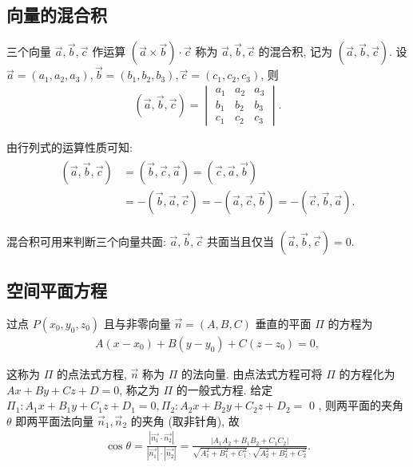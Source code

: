 \subsection{向量的混合积}
三个向量 $\vec{a} , \vec{b} , \vec{c}$ 作运算 $(\vec{a} \times \vec{b}) \cdot \vec{c}$ 称为 $\vec{a} , \vec{b} , \vec{c}$ 的混合积, 记为 $(\vec{a}, \vec{b}, \vec{c})$.
设 $\vec{a}=\left(a_1, a_2, a_3\right), \vec{b}=\left(b_1, b_2, b_3\right), \vec{c}=\left(c_1, c_2, c_3\right)$, 则
\begin{align*}
	(\vec{a}, \vec{b}, \vec{c})=\begin{vmatrix}
		                            a_1 & a_2 & a_3 \\
		                            b_1 & b_2 & b_3 \\
		                            c_1 & c_2 & c_3
	                            \end{vmatrix} .
\end{align*}

由行列式的运算性质可知:
\begin{align*}
	\begin{aligned}
		{(\vec{a}, \vec{b}, \vec{c}) } & =(\vec{b}, \vec{c}, \vec{a})=(\vec{c}, \vec{a}, \vec{b})                                  \\
		                               & =-(\vec{b}, \vec{a}, \vec{c})=-(\vec{a}, \vec{c}, \vec{b})=-(\vec{c}, \vec{b}, \vec{a}) .
	\end{aligned}
\end{align*}

混合积可用来判断三个向量共面: $\vec{a}, \vec{b}, \vec{c}$ 共面当且仅当 $(\vec{a}, \vec{b}, \vec{c})=0$.

\subsection{空间平面方程}
过点 $P\left(x_0, y_0, z_0\right)$ 且与非零向量 $\vec{n}=(A, B, C)$ 垂直的平面 $\Pi$ 的方程为
\begin{align*}
	A\left(x-x_0\right)+B\left(y-y_0\right)+C\left(z-z_0\right)=0,
\end{align*}

这称为 $\Pi$ 的点法式方程, $\vec{n}$ 称为 $\Pi$ 的法向量.
由点法式方程可将 $\Pi$ 的方程化为 $A x+B y+C z+D=0$, 称之为 $\Pi$ 的一般式方程. 给定 $\Pi_1: A_1 x+B_1 y+C_1 z+D_1=0, \Pi_2: A_2 x+B_2 y+C_2 z+D_2=$ 0 , 则两平面的夹角 $\theta$ 即两平面法向量 $\vec{n}_1, \vec{n}_2$ 的夹角 (取非针角), 故
\begin{align*}
	\cos \theta=\frac{\left|\overrightarrow{n_1} \cdot \overrightarrow{n_2}\right|}{\left|\overrightarrow{n_1}\right| \cdot\left|\overrightarrow{n_2}\right|}=\frac{\left|A_1 A_2+B_1 B_2+C_1 C_2\right|}{\sqrt{A_1^2+B_1^2+C_1^2} \cdot \sqrt{A_2^2+B_2^2+C_2^2}} .
\end{align*}

